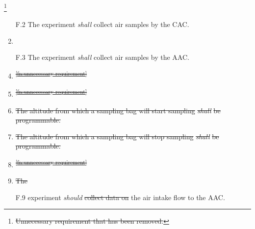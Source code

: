 \documentclass[a4paper,12pt,twoside]{article}
\providecommand{\DIFaddtex}[1]{{\protect\color{blue}\uwave{#1}}} %
\providecommand{\DIFdeltex}[1]{{\protect\color{red}\sout{#1}}}                      %
\providecommand{\DIFaddbegin}{} %
\providecommand{\DIFaddend}{} %
\providecommand{\DIFdelbegin}{} %
\providecommand{\DIFdelend}{} %
\providecommand{\DIFadd}[1]{\texorpdfstring{\DIFaddtex{#1}}{#1}} %
\providecommand{\DIFdel}[1]{\texorpdfstring{\DIFdeltex{#1}}{}} %
\newcommand{\DIFscaledelfig}{0.5}
\newlength{\DIFdelgraphicswidth} %
\newlength{\DIFdelgraphicsheight} %
\newcommand{\DIFaddincludegraphics}[2][]{{\color{blue}\fbox{\DIFOincludegraphics[#1]{#2}}}} %
\newcommand{\DIFdelincludegraphics}[2][]{%
\sbox{\DIFdelgraphicsbox}{\DIFOincludegraphics[#1]{#2}}%
\settoboxwidth{\DIFdelgraphicswidth}{\DIFdelgraphicsbox} %
\settoboxtotalheight{\DIFdelgraphicsheight}{\DIFdelgraphicsbox} %
\scalebox{\DIFscaledelfig}{%
\parbox[b]{\DIFdelgraphicswidth}{\usebox{\DIFdelgraphicsbox}\\[-\baselineskip] \rule{\DIFdelgraphicswidth}{0em}}\llap{\resizebox{\DIFdelgraphicswidth}{\DIFdelgraphicsheight}{%
\setlength{\unitlength}{\DIFdelgraphicswidth}%
\begin{picture}(1,1)%
\thicklines\linethickness{2pt} %
{\color[rgb]{1,0,0}\put(0,0){\framebox(1,1){}}}%
{\color[rgb]{1,0,0}\put(0,0){\line( 1,1){1}}}%
{\color[rgb]{1,0,0}\put(0,1){\line(1,-1){1}}}%
\end{picture}%
}\hspace*{3pt}}} %
} %
\DeclareRobustCommand{\DIFaddbegin}{\DIFOaddbegin \let\includegraphics\DIFaddincludegraphics} %
\DeclareRobustCommand{\DIFaddend}{\DIFOaddend \let\includegraphics\DIFOincludegraphics} %
\DeclareRobustCommand{\DIFdelbegin}{\DIFOdelbegin \let\includegraphics\DIFdelincludegraphics} %
\DeclareRobustCommand{\DIFdelend}{\DIFOaddend \let\includegraphics\DIFOincludegraphics} %
\begin{document}
\DIFdelbegin %
\footnote{\DIFdel{Unnecessary requirement that has been removed.}%
}
\addtocounter{footnote}{-1}%
\DIFdelend \DIFaddbegin \begin{enumerate}
    \item[F.2] \DIFaddend The experiment \textit{shall} collect air samples by the CAC.
    \DIFdelbegin %
\item%
\DIFdelend \DIFaddbegin \item[F.3] \DIFaddend The experiment \textit{shall} collect air samples by the AAC.
    \DIFdelbegin %
\item%
\DIFdel{\textsuperscript{\ref{fn:unnecessary-requirement}}
    }%
\item%
\DIFdel{\textsuperscript{\ref{fn:unnecessary-requirement}}
    }%
\item%
\DIFdel{The altitude from which a sampling bag will start sampling }\textit{\DIFdel{shall}} %
\DIFdel{be programmable.
    }%
\item%
\DIFdel{The altitude from which a sampling bag will stop sampling }\textit{\DIFdel{shall}} %
\DIFdel{be programmable.
    }%
\item%
\DIFdel{\textsuperscript{\ref{fn:unnecessary-requirement}}
    }%
\item%
\DIFdel{The }\DIFdelend \DIFaddbegin \item[F.9] \DIFadd{The }\DIFaddend experiment \textit{should} \DIFdelbegin \DIFdel{collect data on }\DIFdelend \DIFaddbegin \DIFadd{measure }\DIFaddend the air intake flow to the AAC.

\end{enumerate}
\end{document}
